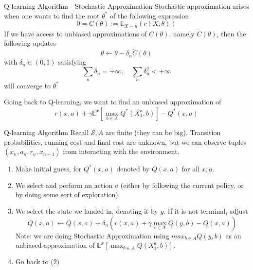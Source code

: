 \documentclass{beamer}
\newtheorem{remark}{Remark}[theorem]
\begin{document}
\begin{frame}{Q-learning Algorithm - Stochastic Approximation}
Stochastic approximation arises when one wants to find the root $\theta^*$ of the following expression
\[
0 = C(\theta) := \mathbb E_{X\sim \mu} (c(X,\theta))
\]
If we have access to unbiased approximations of $C(\theta)$, namely $\tilde C(\theta)$, then the following updates
\[
\theta \leftarrow \theta - \delta_n \tilde C(\theta) 
\]
 with $\delta_n\in(0,1)$ satisfying
\[
\sum_n \delta_n = +\infty, \quad \sum_n \delta_n^2 < +\infty
\]
will converge to $\theta^*$

Going back to Q-learning, we want to find an unbiased approximation of
\[
r(x,a) + \gamma \mathbb E^x [\max_{b\in A}Q^*(X^a_1,b)] - Q^*(x,a)
\]
%
\end{frame}

\begin{frame}{Q-learning Algorithm}
Recall $\mathcal S, A$ are finite (they can be big). Transition probabilities, running cost and final cost are unknown, but we can observe tuples $(x_n, a_n, r_n,x_{n+1})$ from interacting with the environment. 
\begin{enumerate}
	\item Make initial guess, for $Q^*(x,a)$ denoted by $Q(x,a)$ for all $x,a$.
	\item We select and perform an action $a$ (either by following the current policy, or by doing some sort of exploration).
	\item We select the state we landed in, denoting it by $y$. If it is not terminal, adjust
	\[
	Q(x, a) \leftarrow Q(x, a) + \delta_n \left( r(x,a) + \gamma \max_{b\in A}Q(y,b) - Q(x,a)  \right)
	\]
	Note: we are doing Stochastic Approximation using $max_{b\in A}Q(y,b)$ as an unbiased approximation of $\mathbb E^x [\max_{b\in A}Q(X^a_1,b)]$.
	\item Go back to (2)
\end{enumerate}
\end{frame}
\end{document}
